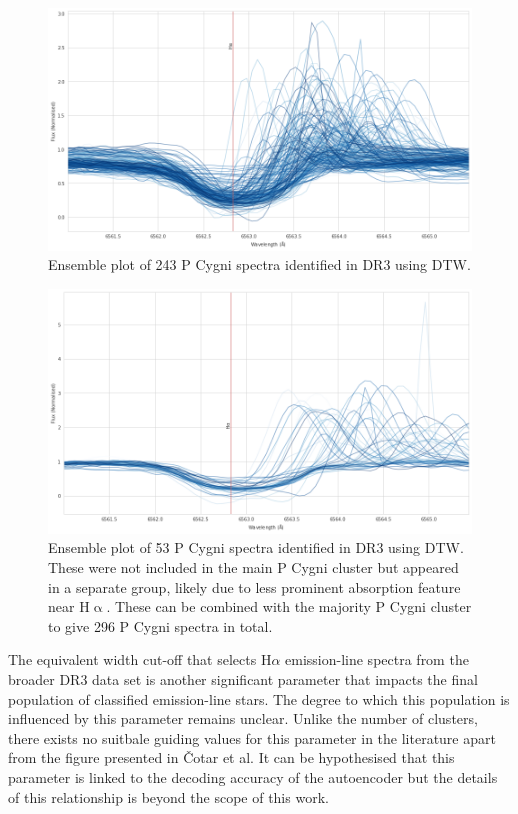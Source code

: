 \begin{figure}[!htb]
\centering
\includegraphics[scale=0.45]{figures/p cygni ensemble.png}
\caption{Ensemble plot of 243 P Cygni spectra identified in DR3 using DTW.}
\end{figure}

\begin{figure}[!htb]
\centering
\includegraphics[scale=0.45]{figures/p cugni 2.png}
\caption{Ensemble plot of 53 P Cygni spectra identified in DR3 using DTW. These were not included in the main P Cygni cluster but appeared in a separate group, likely due to less prominent absorption feature near H$\upalpha$. These can be combined with the majority P Cygni cluster to give 296 P Cygni spectra in total.}
\end{figure}

The equivalent width cut-off that selects H$\alpha$ emission-line spectra from the broader DR3 data set is another significant parameter that impacts the final population of classified emission-line stars. The degree to which this population is influenced by this parameter remains unclear. Unlike the number of clusters, there exists no suitbale guiding values for this parameter in the literature apart from the figure presented in Čotar et al. It can be hypothesised that this parameter is linked to the decoding accuracy of the autoencoder but the details of this relationship is beyond the scope of this work.



